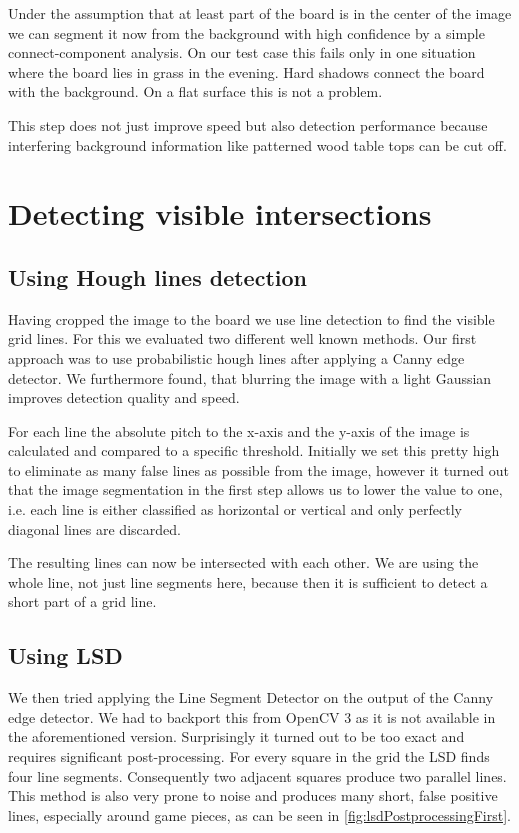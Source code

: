 	Under the assumption that at least part of the board is in the center of the image we can segment it now from the background with high confidence by a simple connect-component analysis. On our test case this fails only in one situation where the board lies in grass in the evening. Hard shadows connect the board with the background. On a flat surface this is not a problem.

	This step does not just improve speed but also detection performance because interfering background information like patterned wood table tops can be cut off.

	\section{Detecting visible intersections}
	\subsection{Using Hough lines detection}
	\label{detector-visible-hough}
	Having cropped the image to the board we use line detection to find the visible grid lines. For this we evaluated two different well known methods. Our first approach was to use probabilistic hough lines after applying a Canny edge detector. We furthermore found, that blurring the image with a light Gaussian improves detection quality and speed.

	For each line the absolute pitch to the x-axis and the y-axis of the image is calculated and compared to a specific threshold. Initially we set this pretty high to eliminate as many false lines as possible from the image, however it turned out that the image segmentation in the first step allows us to lower the value to one, i.e. each line is either classified as horizontal or vertical and only perfectly diagonal lines are discarded.

	The resulting lines can now be intersected with each other. We are using the whole line, not just line segments here, because then it is sufficient to detect a short part of a grid line.

	\subsection{Using LSD}
	\label{detector-visible-lsd}
	We then tried applying the Line Segment Detector \cite{von2012lsd} on the output of the Canny edge detector. We had to backport this from OpenCV 3 as it is not available in the aforementioned version. Surprisingly it turned out to be too exact and requires significant post-processing. For every square in the grid the LSD finds four line segments. Consequently two adjacent squares produce two parallel lines. This method is also very prone to noise and produces many short, false positive lines, especially around game pieces, as can be seen in \ref{fig:lsdPostprocessingFirst}.

